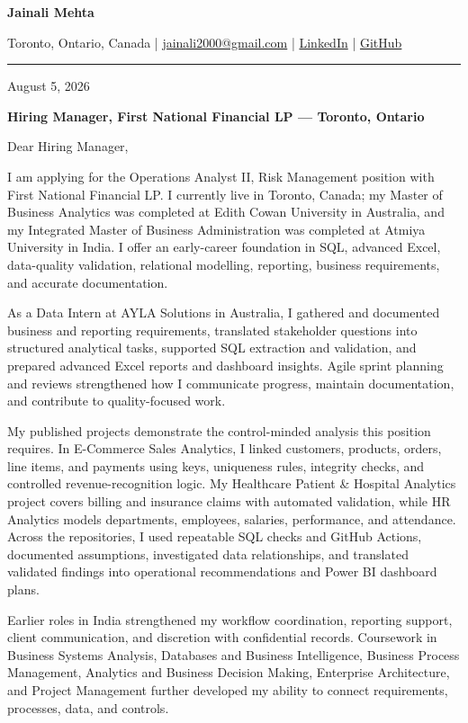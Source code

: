 \documentclass[letterpaper,10pt]{article}
\begin{document}
\begin{center}
  {\fontsize{17}{19}\selectfont\textbf{Jainali Mehta}}\par\vspace{2pt}
  \small Toronto, Ontario, Canada \;|\;
  \href{mailto:jainali2000@gmail.com}{jainali2000@gmail.com} \;|\;
  \href{https://www.linkedin.com/in/jainali-mehta}{LinkedIn} \;|\;
  \href{https://github.com/jainalimehta}{GitHub}
\end{center}
\vspace{-5pt}
\noindent\rule{\textwidth}{0.4pt}

August 5, 2026

\textbf{Hiring Manager, First National Financial LP --- Toronto, Ontario}

Dear Hiring Manager,

I am applying for the Operations Analyst II, Risk Management position with First National Financial LP. I currently live in Toronto, Canada; my Master of Business Analytics was completed at Edith Cowan University in Australia, and my Integrated Master of Business Administration was completed at Atmiya University in India. I offer an early-career foundation in SQL, advanced Excel, data-quality validation, relational modelling, reporting, business requirements, and accurate documentation.

As a Data Intern at AYLA Solutions in Australia, I gathered and documented business and reporting requirements, translated stakeholder questions into structured analytical tasks, supported SQL extraction and validation, and prepared advanced Excel reports and dashboard insights. Agile sprint planning and reviews strengthened how I communicate progress, maintain documentation, and contribute to quality-focused work.

My published projects demonstrate the control-minded analysis this position requires. In E-Commerce Sales Analytics, I linked customers, products, orders, line items, and payments using keys, uniqueness rules, integrity checks, and controlled revenue-recognition logic. My Healthcare Patient \& Hospital Analytics project covers billing and insurance claims with automated validation, while HR Analytics models departments, employees, salaries, performance, and attendance. Across the repositories, I used repeatable SQL checks and GitHub Actions, documented assumptions, investigated data relationships, and translated validated findings into operational recommendations and Power BI dashboard plans.

Earlier roles in India strengthened my workflow coordination, reporting support, client communication, and discretion with confidential records. Coursework in Business Systems Analysis, Databases and Business Intelligence, Business Process Management, Analytics and Business Decision Making, Enterprise Architecture, and Project Management further developed my ability to connect requirements, processes, data, and controls.
\end{document}
